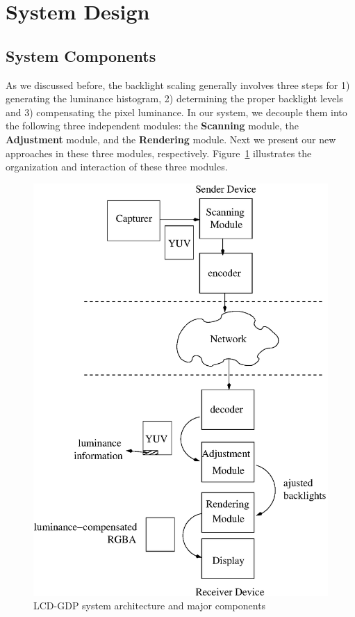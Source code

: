 \section{System Design}
\label{sec:design}

\subsection{System Components}
As we discussed before, the backlight scaling generally involves three
steps for 1) generating the luminance histogram, 2) determining the
proper backlight levels and 3) compensating the pixel luminance. In
our system, we decouple them into the following three independent
modules: the {\bf Scanning} module, the {\bf Adjustment} module, and
the {\bf Rendering} module. Next we present our new approaches in
these three modules, respectively. Figure~\ref{fig:design} illustrates
the organization and interaction of these three modules.

\begin{figure}[t]
  \begin{center}
  \includegraphics[scale=.5]{./figures/design.eps}
  \caption{LCD-GDP system architecture and major components}
\label{fig:design}
  \end{center}
\end{figure}



